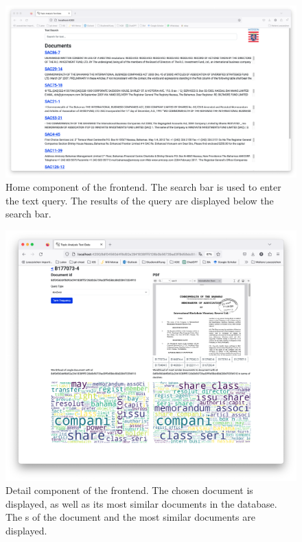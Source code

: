 \begin{figure}[!htp] %
    \centering
    \includegraphics[width=1\textwidth]{images/UI/Home_component.png}
    \caption[Home component of the frontend]{Home component of the frontend.
    The search bar is used to enter the text query.
    The results of the query are displayed below the search bar.
    }
    \label{fig:home_comp}
\end{figure}

\begin{figure}[!htp] %
    \centering
    \includegraphics[width=1\textwidth]{images/UI/Home_detail.png}
    \caption[Detail component of the frontend]{Detail component of the frontend.
    The chosen document is displayed, as well as its most similar documents in the database.
    The \wordcloud{}s of the document and the most similar documents are displayed.
    }
    \label{fig:detail_comp}
\end{figure}

